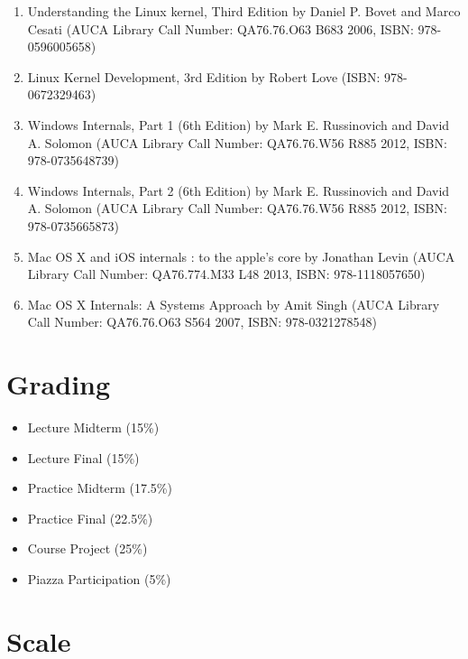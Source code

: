 \documentclass[12pt,a4paper,oneside]{article}
\begin{document}
            \begin{enumerate}
                \item Understanding the Linux kernel, Third Edition by Daniel P.
                Bovet and Marco Cesati (AUCA Library Call Number: QA76.76.O63
                B683 2006, ISBN: 978-0596005658)
                \item Linux Kernel Development, 3rd Edition by Robert Love
                (ISBN: 978-0672329463)
                \item Windows Internals, Part 1 (6th Edition) by Mark E.
                Russinovich and David A. Solomon (AUCA Library Call Number:
                QA76.76.W56 R885 2012, ISBN: 978-0735648739)
                \item Windows Internals, Part 2 (6th Edition) by Mark E.
                Russinovich and David A. Solomon (AUCA Library Call Number:
                QA76.76.W56 R885 2012, ISBN: 978-0735665873)
                \item Mac OS X and iOS internals : to the apple's core by
                Jonathan Levin (AUCA Library Call Number: QA76.774.M33 L48 2013,
                ISBN: 978-1118057650)
                \item Mac OS X Internals: A Systems Approach by Amit Singh (AUCA
                Library Call Number: QA76.76.O63 S564 2007, ISBN:
                978-0321278548)
            \end{enumerate}

    \section{Grading}

        \begin{itemize}
            \item Lecture Midterm (15\%)
            \item Lecture Final (15\%)
            \item Practice Midterm (17.5\%)
            \item Practice Final (22.5\%)
            \item Course Project (25\%)
            \item Piazza Participation (5\%)
        \end{itemize}

    \section{Scale}
\end{document}
